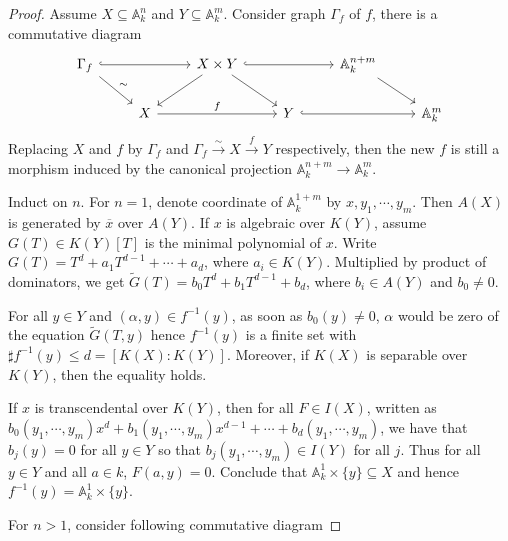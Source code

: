 \documentclass{ctexart}
\begin{document}
\begin{proof}
    Assume $X \subseteq \mathbb{A}_{k}^{n}$ and $Y \subseteq \mathbb{A}_{k}^{m}$.
    Consider graph $\Gamma_{f}$ of $f$, there is a commutative diagram
    \begin{equation}
        \begin{tikzcd}
            \Gamma_{f} \arrow[rr, hookrightarrow] \arrow[dr, "\sim"] &&
            X \times Y \arrow[rr, hookrightarrow] \arrow[dr] \arrow[dl] &&
            \mathbb{A}_{k}^{n + m} \arrow[dr] & \\
            & X \arrow[rr, "f"] &&
            Y \arrow[rr, hookrightarrow] &&
            \mathbb{A}_{k}^{m}
        \end{tikzcd}
    \end{equation}
    Replacing $X$ and $f$ by $\Gamma_{f}$ and $\Gamma_{f} \overset{\sim}{\rightarrow} X \overset{f}{\rightarrow} Y$ respectively,
    then the new $f$ is still a morphism induced by the canonical projection $\mathbb{A}_{k}^{n + m} \rightarrow \mathbb{A}_{k}^{m}$.
    \par
    Induct on $n$. 
    For $n = 1$, denote coordinate of $\mathbb{A}_{k}^{1 + m}$ by $x, y_{1}, \cdots, y_{m}$.
    Then $A(X)$ is generated by $\overline{x}$ over $A(Y)$.
    If $x$ is algebraic over $K(Y)$, assume $G(T)\in K(Y)[T]$ is the minimal polynomial of $x$.
    Write $G(T) = T^{d} + a_{1}T^{d - 1} + \cdots + a_{d}$, where $a_{i}\in K(Y)$.
    Multiplied by product of dominators, we get $\widetilde{G}(T) = b_{0}T^{d} + b_{1}T^{d - 1} + b_{d}$, where $b_{i}\in A(Y)$ and $b_{0} \neq 0$.
    \par
    For all $y\in Y$ and $(\alpha, y)\in f^{-1}(y)$, as soon as $b_{0}(y) \neq 0$,
    $\alpha$ would be zero of the equation $\widetilde{G}(T, y)$ hence $f^{-1}(y)$ is a finite set with $\sharp f^{-1}(y) \le d = [K(X) : K(Y)]$.
    Moreover, if $K(X)$ is separable over $K(Y)$, then the equality holds.
    \par
    If $x$ is transcendental over $K(Y)$, then for all $F\in I(X)$,
    written as $b_{0}(y_{1}, \cdots, y_{m})x^{d} + b_{1}(y_{1}, \cdots, y_{m})x^{d - 1} + \cdots + b_{d}(y_{1}, \cdots, y_{m})$,
    we have that $b_{j}(y) = 0$ for all $y\in Y$ so that $b_{j}(y_{1}, \cdots, y_{m})\in I(Y)$ for all $j$.
    Thus for all $y\in Y$ and all $a\in k$, $F(a, y) = 0$.
    Conclude that $\mathbb{A}_{k}^{1} \times \{y\} \subseteq X$ and hence $f^{-1}(y) = \mathbb{A}_{k}^{1} \times \{y\}$.
    \par
    For $n > 1$, consider following commutative diagram

\end{proof}
\end{document}
